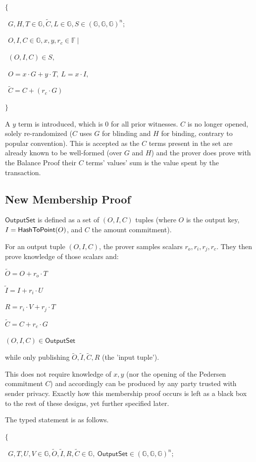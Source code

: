 \documentclass[]{article}
\begin{document}
$\{$

$~~G, H, T \in \mathbb{G}, \tilde{C}, L \in \mathbb{G}, S \in (\mathbb{G}, \mathbb{G}, \mathbb{G})^n;$

$~~O, I, C \in \mathbb{G}, x, y, r_c \in \mathbb{F} ~|$

$~~(O, I, C) \in S,~$

$~~O = x \cdot G + y \cdot T,~ L = x \cdot I,$

$~~\tilde{C} = C + (r_c \cdot G)$

$\}$

A $y$ term is introduced, which is $0$ for all prior witnesses. $C$ is no longer opened, solely re-randomized ($C$ uses $G$ for blinding and $H$ for binding, contrary to popular convention). This is accepted as the $C$ terms present in the set are already known to be well-formed (over $G$ and $H$) and the prover does prove with the Balance Proof their $C$ terms' values' sum is the value spent by the transaction.

\subsection{New Membership Proof}

$\mathsf{OutputSet}$ is defined as a set of $(O, I, C)$ tuples (where $O$ is the output key, $I = \mathsf{HashToPoint}(O)$, and $C$ the amount commitment). 

For an output tuple $(O, I, C)$, the prover samples scalars $r_o, r_i, r_j, r_c$. They then prove knowledge of those scalars and:

$\tilde{O} = O + r_o \cdot T$

$\tilde{I} = I + r_i \cdot U$

$R = r_i \cdot V + r_j \cdot T$

$\tilde{C} = C + r_c \cdot G$

$(O, I, C) \in \mathsf{OutputSet}$

while only publishing $\tilde{O}, \tilde{I}, \tilde{C}, R$ (the 'input tuple').

This does not require knowledge of $x, y$ (nor the opening of the Pedersen commitment $C$) and accordingly can be produced by any party trusted with sender privacy. Exactly how this membership proof occurs is left as a black box to the rest of these designs, yet further specified later.

The typed statement is as follows.

$\{$

$~~G, T, U, V \in \mathbb{G}, \tilde{O}, \tilde{I}, R, \tilde{C} \in \mathbb{G},~ \mathsf{OutputSet} \in (\mathbb{G}, \mathbb{G}, \mathbb{G})^n;$
\end{document}
